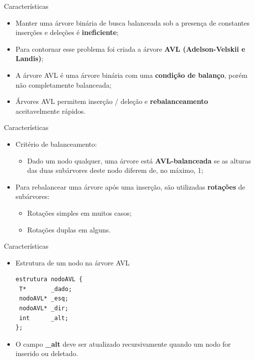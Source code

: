 \documentclass[12pt,table,xcolor={dvipsnames}]{beamer}
\begin{document}
\begin{frame}[fragile]{Características}
\begin{itemize}
\item Manter uma árvore binária de busca balanceada sob a presença de constantes inserções e deleções é \textbf{ineficiente};
\item Para contornar esse problema foi criada a árvore \textbf{AVL (Adelson-Velskii e Landis)};
\item A árvore AVL é uma árvore binária com uma \textbf{condição de balanço}, porém não completamente balanceada;
\item Árvores AVL permitem inserção / deleção e \textbf{rebalanceamento} aceitavelmente rápidos.
\end{itemize}
\end{frame}

\begin{frame}[fragile]{Características}
\begin{itemize}
\item Critério de balanceamento:
\begin{itemize}
\item Dado um nodo qualquer, uma árvore está \textbf{AVL-balanceada} se as alturas das duas subárvores deste nodo diferem de, no máximo, 1;
\end{itemize}
\item Para rebalancear uma árvore após uma inserção, são utilizadas \textbf{rotações} de subárvores:
\begin{itemize}
\item Rotações simples em muitos casos;
\item Rotações duplas em alguns.
\end{itemize}
\end{itemize}
\end{frame}

\begin{frame}[fragile]{Características}
\begin{itemize}
\item Estrutura de um nodo na árvore AVL 
\begin{lstlisting}
estrutura nodoAVL {         
 T*       _dado;
 nodoAVL* _esq;    
 nodoAVL* _dir;     
 int      _alt; 
};
\end{lstlisting}
\item O campo \textbf{\_alt} deve ser atualizado recursivamente quando um nodo for inserido ou deletado.
\end{itemize}
\end{frame}
\end{document}
